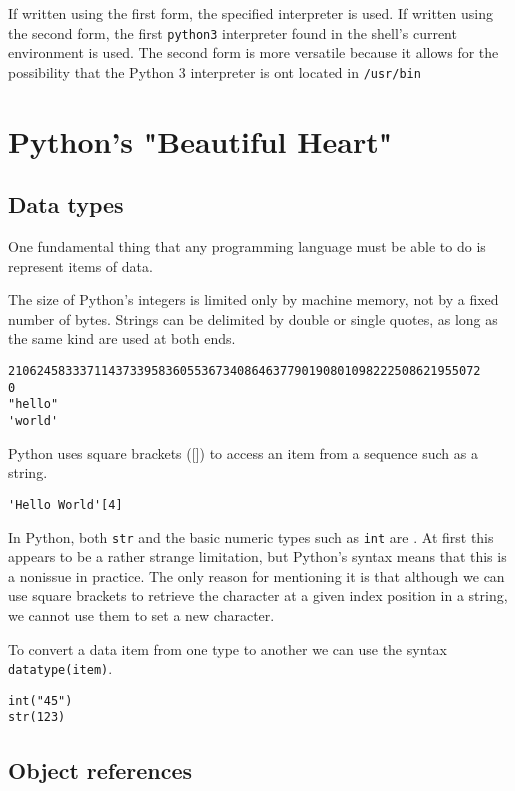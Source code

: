 If written using the first form, the specified interpreter is used.
If written using the second form, the first \verb|python3| interpreter found in the shell's current environment is used.
The second form is more versatile because it allows for the possibility that the Python 3 interpreter is ont located in \verb|/usr/bin|



\section{Python's "Beautiful Heart"}


\subsection{Data types}


One fundamental thing that any programming language must be able to do is represent items of data.

The size of Python's integers is limited only by machine memory, not by a fixed number of bytes.
Strings can be delimited by double or single quotes, as long as the same kind are used at both ends.


\begin{lstlisting}
210624583337114373395836055367340864637790190801098222508621955072
0
"hello"
'world'
\end{lstlisting}


Python uses square brackets ([]) to access an item from a sequence such as a string.

\begin{lstlisting}
'Hello World'[4]
\end{lstlisting}


In Python, both \verb|str| and the basic numeric types such as \verb|int| are .
At first this appears to be a rather strange limitation, but Python's syntax means that this is a nonissue in practice.
The only reason for mentioning it is that although we can use square brackets to retrieve the character at a given index position in a string, we cannot use them to set a new character.



To convert a data item from one type to another we can use the syntax \verb|datatype(item)|.
\begin{lstlisting}
int("45")
str(123)
\end{lstlisting}



\subsection{Object references}

